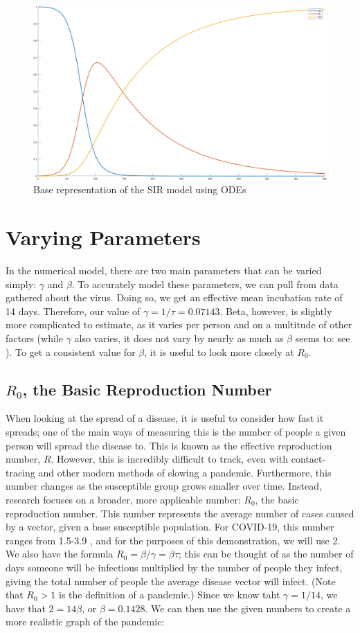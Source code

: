 \documentclass{article}
\begin{document}
\begin{figure}[H]
 \centering
 \includegraphics[scale = 0.4]{pic1.png}
 \caption{Base representation of the SIR model using ODEs}
 \label{fig1}
\end{figure}

\section{Varying Parameters}
In the numerical model, there are two main parameters that can be varied simply: $\gamma$ and $\beta$. To accurately model these parameters, we can pull from data gathered about the virus. Doing so, we get an effective mean incubation rate of 14 days. Therefore, our value of $\gamma = 1/\tau = 0.07143$. Beta, however, is slightly more complicated to estimate, as it varies per person and on a multitude of other factors (while $\gamma$ also varies, it does not vary by nearly as much as $\beta$ seems to: see \cite{rnot1}). To get a consistent value for $\beta$, it is useful to look more closely at $R_0$.

\subsection{$R_0$, the Basic Reproduction Number}
When looking at the spread of a disease, it is useful to consider how fast it spreads; one of the main ways of measuring this is the number of people a given person will spread the disease to. This is known as the effective reproduction number, $R$. However, this is incredibly difficult to track, even with contact-tracing and other modern methods of slowing a pandemic. Furthermore, this number changes as the susceptible group grows smaller over time. Instead, research focuses on a broader, more applicable number: $R_0$, the basic reproduction number. This number represents the average number of cases caused by a vector, given a base susceptible population. For COVID-19, this number ranges from 1.5-3.9 \cite{rnot2}, and for the purposes of this demonstration, we will use 2. We also have the formula $R_0 = \beta / \gamma = \beta\tau$; this can be thought of as the number of days someone will be infectious multiplied by the number of people they infect, giving the total number of people the average disease vector will infect. (Note that $R_0 > 1$ is the definition of a pandemic.) Since we know taht $\gamma = 1/14$, we have that $2 = 14\beta$, or $\beta = 0.1428$. We can then use the given numbers to create a more realistic graph of the pandemic:
\end{document}
